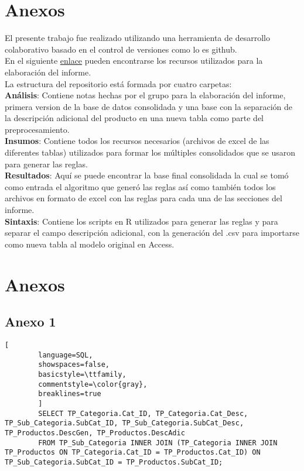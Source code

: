\documentclass[]{article}
\begin{document}
	\section{Anexos}
	
	El presente trabajo fue realizado utilizando una herramienta de desarrollo colaborativo basado en el control de versiones como lo es github.\\
	
	\noindent En el siguiente \href{https://github.com/jairoji/DM_TP1/tree/master/TP1}{enlace} pueden encontrarse los recursos utilizados para la elaboración del informe.\\
	 
	
	\noindent La estructura del repositorio está formada por cuatro carpetas:\\
	
	\textbf{Análisis}: Contiene notas hechas por el grupo para la elaboración del informe, primera version de la base de datos consolidada y una base con la separación de la descripción adicional del producto en una nueva tabla como parte del preprocesamiento.\\
	
	\textbf{Insumos}: Contiene todos los recursos necesarios (archivos de excel de las diferentes tablas) utilizados para formar los múltiples consolidados que se usaron para generar las reglas.\\
	
	\textbf{Resultados}: Aquí se puede encontrar la base final consolidada la cual se tomó como entrada el algoritmo que generó las reglas así como también todos los  archivos en formato de excel con las reglas para cada una de las secciones del informe.\\
	
	\textbf{Sintaxis}: Contiene los scripts en R utilizados para generar las reglas y para separar el campo descripción adicional, con la generación del .csv para importarse como nueva tabla al modelo original en Access.\\
	
	
	
	
	\section*{Anexos}
	\subsection*{Anexo 1}
	\label{subsec:Anexo1}
		\begin{lstlisting}[
		language=SQL,
		showspaces=false,
		basicstyle=\ttfamily,
		commentstyle=\color{gray},
		breaklines=true
		]
		SELECT TP_Categoria.Cat_ID, TP_Categoria.Cat_Desc, TP_Sub_Categoria.SubCat_ID, TP_Sub_Categoria.SubCat_Desc, TP_Productos.DescGen, TP_Productos.DescAdic
		FROM TP_Sub_Categoria INNER JOIN (TP_Categoria INNER JOIN TP_Productos ON TP_Categoria.Cat_ID = TP_Productos.Cat_ID) ON TP_Sub_Categoria.SubCat_ID = TP_Productos.SubCat_ID;
		
		\end{lstlisting}
	
	
\end{document}
